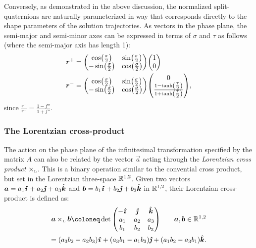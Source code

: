Conversely, as demonstrated in the above discussion, the normalized split-quaternions are naturally parameterized in way that corresponds directly to the shape parameters of the solution trajectories. As vectors in the phase plane, the semi-major and semi-minor axes can be expressed in terms of \(\sigma\) and \(\tau\) as follows (where the semi-major axis has length 1):
\begin{equation}
    \begin{split}
        \vec{r}^+ &= \mqty(\cos(\tfrac{\sigma}{2}) & \sin(\tfrac{\sigma}{2}) \\ -\sin(\tfrac{\sigma}{2}) & \cos(\tfrac{\sigma}{2}))\mqty(1 \\ 0 ) \\
        \vec{r}^- &= \mqty(\cos(\tfrac{\sigma}{2}) & \sin(\tfrac{\sigma}{2}) \\ -\sin(\tfrac{\sigma}{2}) & \cos(\tfrac{\sigma}{2}))\mqty( 0 \\ \frac{1 - \tanh(\tfrac{\tau}{2})}{1 + \tanh(\tfrac{\tau}{2})}), \\
    \end{split}
    \label{eq:major_axes}
\end{equation}
since \(\displaystyle \frac{r^-}{r^+} = \frac{1 - f''}{1 + f''}\).

\subsubsection{The Lorentzian cross-product}
The action on the phase plane of the infinitesimal transformation specified by the matrix \(A\) can also be related by the vector \(\vec{a}\) acting through the \emph{Lorentzian cross product} \(\times_\text{\tiny{L}} \). This is a binary operation similar to the convential cross product, but set in the Lorentzian three-space \(\mathbb{R}^{1, 2}\). Given two vectors \(\vec{a} = a_1\quati + a_2\quatj + a_3\quatk\) and \(\vec{b} = b_1\quati + b_2\quatj + b_3\quatk\) in \(\mathbb{R}^{1, 2}\), their Lorentzian cross-product is defined as: \cite{Jafari2014}
\begin{gather}
        \lorcrossp{\vec{a}}{\vec{b}} \coloneq \det\mqty(-\quati & \quatj & \quatk \\ a_1 & a_2 & a_3 \\ b_1 & b_2 & b_3) \qquad \vec{a}, \vec{b} \in \real^{1, 2} \\
            = \qty(a_3b_2 - a_2b_3)\quati + \qty(a_3b_1 - a_1b_3)\quatj + \qty(a_1b_2 - a_3b_1)\quatk.
\end{gather}

